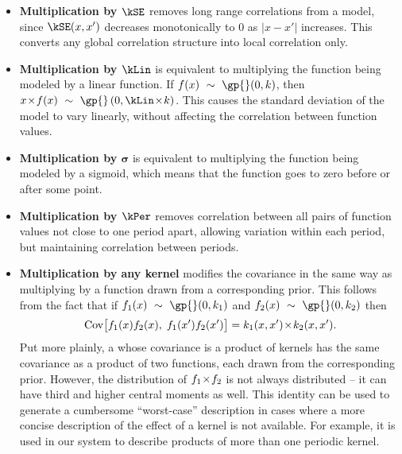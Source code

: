 \begin{itemize}
\item {\bf Multiplication by $\kSE$} removes long range correlations from a model, since $\kSE(x,x')$ decreases monotonically to 0 as $|x - x'|$ increases.
This converts any global correlation structure into local correlation only.

\item {\bf Multiplication by $\kLin$} is equivalent to multiplying the function being modeled by a linear function.
If $f(x) \dist \gp{}(0, \kernel)$, then $x \kerntimes f(x) \dist \gp{}\left(0, \kLin \kerntimes k \right)$.
This causes the standard deviation of the model to vary linearly, without affecting the correlation between function values.

\item {\bf Multiplication by $\boldsymbol\sigma$} is equivalent to multiplying the function being modeled by a sigmoid, which means that the function goes to zero before or after some point.

\item {\bf Multiplication by $\kPer$}
removes correlation between all pairs of function values not close to one period apart, allowing variation within each period, but maintaining correlation between periods.

\item {\bf Multiplication by any kernel}
modifies the covariance in the same way as multiplying by a function drawn from a corresponding \gp{} prior.
This follows from the fact that if ${f_1(x) \dist \gp{}(0, \kernel_1)}$ and ${f_2(x) \dist \gp{}(0, \kernel_2)}$ then
%
\begin{align}
{\textrm{Cov} \big[f_1(x)f_2(x), \; f_1(x')f_2(x') \big] = k_1(x,x')  \! \times \!k_2(x,x')}.
\end{align}
%
Put more plainly, a \gp{} whose covariance is a product of kernels has the same covariance as a product of two functions, each drawn from the corresponding \gp{} prior.
However, the distribution of $f_1 \! \times \! f_2$ is not always \gp{} distributed -- it can have third and higher central moments as well.
This identity can be used to generate a cumbersome ``worst-case'' description in cases where a more concise description of the effect of a kernel is not available.
For example, it is used in our system to describe products of more than one periodic kernel.
\end{itemize}

